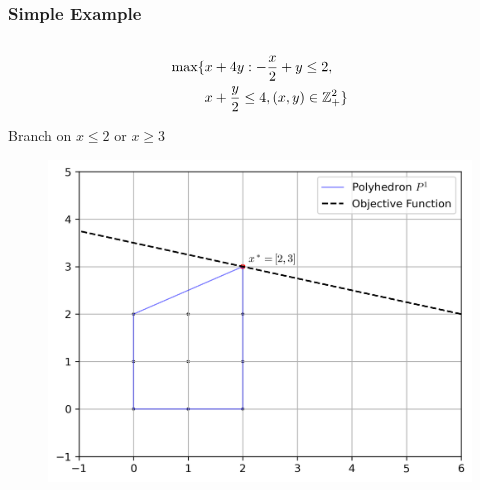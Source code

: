 \documentclass{beamer}
\begin{document}
	\begin{frame}[t]
		\frametitle{Simple Example}
		\footnotesize
		\begin{columns}[T]
			\begin{column}{0.45\textwidth}
				\vspace{-.75cm}
				\begin{align}
					\begin{split}
						\text{max} \{ &x + 4y : -\frac{x}{2} + y \leq 2, \\
						&x + \frac{y}{2} \leq 4, (x, y) \in \mathbb{Z}^2_+ \} 
					\end{split}
					\label{left}
				\end{align}
				\vspace{-.5cm}
				\begin{figure}[h]
					\label{p:root}
				\end{figure}
				\centering
				Branch on $ x \leq 2 $ or $ x \geq 3 $
				\begin{figure}[]
					\centering
					\includegraphics[width=.45\textwidth]{P1.png}

\end{figure}
\end{column}
\end{columns}
\end{frame}
\end{document}
